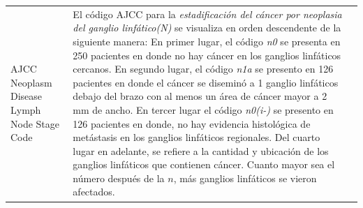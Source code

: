 \begin{table}[!htb]
	\footnotesize
	\begin{threeparttable}
		\begin{tabular}{p{2.5cm} p{7cm} p{6.5cm}} \toprule
			AJCC Neoplasm Disease Lymph Node Stage Code
			& El código AJCC para la \textit{estadificación del cáncer por neoplasia del ganglio linfático(N)} se visualiza en orden descendente de la siguiente manera: En primer lugar, el código \textit{n0} se presenta en 250 pacientes en donde no hay cáncer en los ganglios linfáticos cercanos. En segundo lugar, el código \textit{n1a} se presento en 126 pacientes en donde el cáncer se diseminó a 1 ganglio linfáticos debajo del brazo con al menos un área de cáncer mayor a 2 mm de ancho. En tercer lugar el código \textit{n0(i-)} se presento en 126 pacientes en donde, no hay evidencia histológica de metástasis en los ganglios linfáticos regionales. Del cuarto lugar en adelante, se refiere a la cantidad y ubicación de los ganglios linfáticos que contienen cáncer. Cuanto mayor sea el número después de la $n$, más ganglios linfáticos se vieron afectados.	
			

\end{tabular}
\end{threeparttable}
\end{table}
